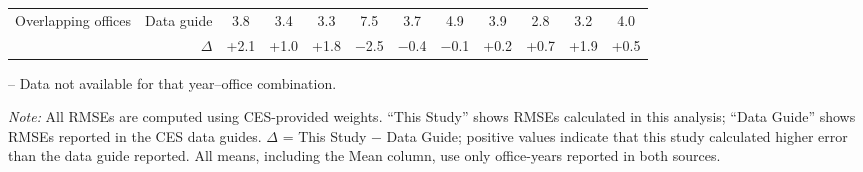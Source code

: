 \begin{table}[p]
{\begin{threeparttable}
\begin{tabular}{lrcccccccccc}
Overlapping offices & Data guide & 3.8 & 3.4 & 3.3 & 7.5 & 3.7 & 4.9 & 3.9 & 2.8 & 3.2 & 4.0 \\
 & $\Delta$ & +2.1 & +1.0 & +1.8 & $-$2.5 & $-$0.4 & $-$0.1 & +0.2 & +0.7 & +1.9 & +0.5 \\
\bottomrule
\end{tabular}
\begin{tablenotes}
\footnotesize
\item -- Data not available for that year--office combination.
\item \textit{Note:} All RMSEs are computed using CES-provided weights. ``This Study'' shows RMSEs calculated in this analysis; ``Data Guide'' shows RMSEs reported in the CES data guides. $\Delta$ = This Study $-$ Data Guide; positive values indicate that this study calculated higher error than the data guide reported. All means, including the Mean column, use only office-years reported in both sources.
\end{tablenotes}
\end{threeparttable}%
}
\end{table}